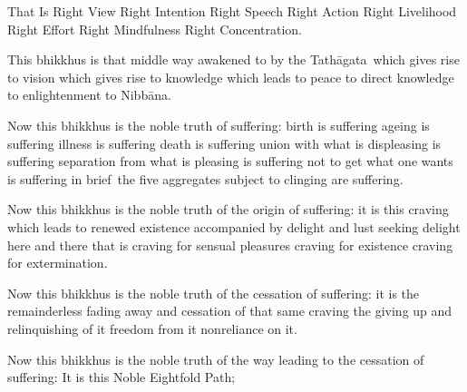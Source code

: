 \medskip

\begin{english-only-hang}
  That Is Right View Right Intention Right Speech Right Action Right Livelihood Right Effort Right Mindfulness Right Concentration.
\end{english-only-hang}

\medskip

\begin{english-only-hang}
  This bhikkhus is that middle way awakened to by the \mbox{Tathāgata}~which gives rise to vision which gives rise to knowledge which leads to peace to direct knowledge to enlightenment to Nibbāna.
\end{english-only-hang}

\medskip

\begin{english-only-hang}
  Now this bhikkhus is the noble truth of suffering: birth is suffering ageing is suffering illness is suffering death is suffering union with what is displeasing is suffering separation from what is pleasing is suffering not to get what one wants is suffering in \mbox{brief}~the five aggregates subject to clinging are suffering.
\end{english-only-hang}

\medskip

\begin{english-only-hang}
  Now this bhikkhus is the noble truth of the origin of suffering: it is this craving which leads to renewed existence accompanied by delight and lust seeking delight here and there that is craving for sensual pleasures craving for existence craving for extermination.
\end{english-only-hang}

\medskip

\begin{english-only-hang}
  Now this bhikkhus is the noble truth of the cessation of suffering: it is the remainderless fading away and cessation of that same craving the giving up and relinquishing of it freedom from it nonreliance on it.
\end{english-only-hang}

\medskip

\begin{english-only-hang}
  Now this bhikkhus is the noble truth of the way leading to the cessation of suffering: It is this Noble Eightfold Path;
\end{english-only-hang}

\medskip

